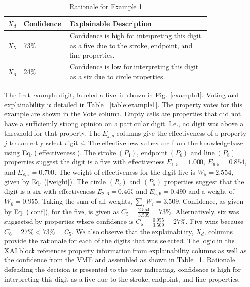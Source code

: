 \documentclass[conference]{IEEEtran}
\begin{document}
\begin{table}[htbp]
\caption{Rationale for Example 1}
\centering
\begin{tabular}{| p{0.04\linewidth} | p{0.14\linewidth} | p{0.65\linewidth} |}
\hline
 $X_d$ & Confidence & Explainable Description \\
\hline \cline{1-3}
$X_5$ & 73\% & Confidence is high for interpreting this digit as a five due to the stroke, endpoint, and line properties. \\ 
\hline
$X_6$ & 24\% & Confidence is low for interpreting this digit as a six due to circle properties. \\
\hline
\end{tabular}
\label{table:exexample1}
\end{table}

The first example digit, labeled a five, is shown in Fig.~\ref{example1}.  Voting and explainability is detailed in Table ~\ref{table:example1}.  The property votes for this example are shown in the Vote column.  Empty cells are properties that did not have a sufficiently strong opinion on a particular digit.  I.e., no digit was above a threshold for that property.   The $E_{j,d}$ columns give the effectiveness of a property $j$ to correctly select digit $d$.  The effectiveness values are from the knowledgebase using Eq. (\ref{effectiveness}).   The stroke $(P_1)$, endpoint $(P_6)$ and line $(P_8)$ properties suggest the digit is a five with effectiveness $E_{1,5}= 1.000$, $E_{6,5}=0.854$, and $E_{8,5}=0.700$.  The weight of effectiveness for the digit five is $W_5=2.554$, given by Eq. (\ref{weight}).  The circle $(P_2)$ and $(P_5)$ properties suggest that the digit is a six with effectiveness $E_{2,6}=0.465$ and $E_{5,6}=0.490$  and a weight of $W_6=0.955$.  Taking the sum of all weights, $\sum\limits_i W_i=3.509$.  Confidence, as given by Eq. (\ref{conf}), for the five, is given as $C_5=\frac{2.554}{3.509} = 73\%$.  Alternatively, six was suggested by properties where confidence is $C_6=\frac{0.955}{3.509}=27\%$.  Five wins because $C_6=27\% < 73\%=C_5$.  We also observe that the explainability, $X_d$, columns provide the rationale for each of the digits that was selected.  The logic in the XAI block references property information from explainability columns as well as the confidence from the VME and assembled as shown in Table~ \ref{table:exexample1}.   Rationale defending the decision is presented to the user indicating, confidence is high for interpreting this digit as a five due to the stroke, endpoint, and line properties. 
\end{document}
